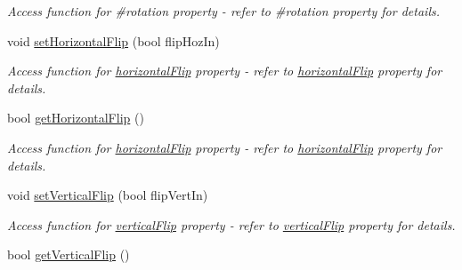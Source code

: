 \begin{DoxyCompactItemize}
\begin{DoxyCompactList}\small\item\em Access function for \#rotation property -\/ refer to \#rotation property for details. \end{DoxyCompactList}\item 
\hypertarget{classQEImage_ab000ab1c63e1925ae614b222820fc3a2}{
void \hyperlink{classQEImage_ab000ab1c63e1925ae614b222820fc3a2}{setHorizontalFlip} (bool flipHozIn)}
\label{classQEImage_ab000ab1c63e1925ae614b222820fc3a2}

\begin{DoxyCompactList}\small\item\em Access function for \hyperlink{classQEImage_a7d9073921f69d33b64c48c273a98ef31}{horizontalFlip} property -\/ refer to \hyperlink{classQEImage_a7d9073921f69d33b64c48c273a98ef31}{horizontalFlip} property for details. \end{DoxyCompactList}\item 
\hypertarget{classQEImage_a56426915cfb757267d7caa8d6be59387}{
bool \hyperlink{classQEImage_a56426915cfb757267d7caa8d6be59387}{getHorizontalFlip} ()}
\label{classQEImage_a56426915cfb757267d7caa8d6be59387}

\begin{DoxyCompactList}\small\item\em Access function for \hyperlink{classQEImage_a7d9073921f69d33b64c48c273a98ef31}{horizontalFlip} property -\/ refer to \hyperlink{classQEImage_a7d9073921f69d33b64c48c273a98ef31}{horizontalFlip} property for details. \end{DoxyCompactList}\item 
\hypertarget{classQEImage_a8636a169ae190e31a7114140f1b0603e}{
void \hyperlink{classQEImage_a8636a169ae190e31a7114140f1b0603e}{setVerticalFlip} (bool flipVertIn)}
\label{classQEImage_a8636a169ae190e31a7114140f1b0603e}

\begin{DoxyCompactList}\small\item\em Access function for \hyperlink{classQEImage_a0b4219b866cd2e75d70e1b58da369bae}{verticalFlip} property -\/ refer to \hyperlink{classQEImage_a0b4219b866cd2e75d70e1b58da369bae}{verticalFlip} property for details. \end{DoxyCompactList}\item 
\hypertarget{classQEImage_a3da2e74544cfa7582e5247889c9795de}{
bool \hyperlink{classQEImage_a3da2e74544cfa7582e5247889c9795de}{getVerticalFlip} ()}
\label{classQEImage_a3da2e74544cfa7582e5247889c9795de}


\end{DoxyCompactItemize}

